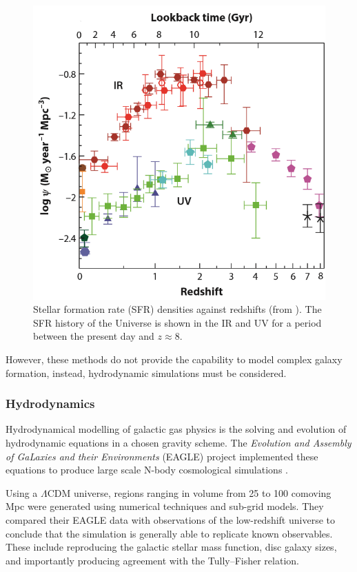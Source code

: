 \documentclass[12pt, twocolumn, nofootinbib]{revtex4-1}    %
\begin{document}
\begin{figure}
\includegraphics[width=\linewidth]{introduction/madau_2012}
\caption{Stellar formation rate (SFR) densities against redshifts (from \citealt{2014ARA&A..52..415M}). The SFR history of the Universe is shown in the IR and UV for a period between the present day and $z\approx8$.}
\label{fig:madau}
\end{figure}

However, these methods do not provide the capability to model complex galaxy formation, instead, hydrodynamic simulations must be considered. 

\vspace{2ex} %
\subsubsection{Hydrodynamics}
\noindent
Hydrodynamical modelling of galactic gas physics is the solving and evolution of hydrodynamic equations in a chosen gravity scheme. The \textit{Evolution and Assembly of GaLaxies and their Environments} (EAGLE) project implemented these equations to produce large scale N-body cosmological simulations \citep{2015MNRAS.446..521S}.

Using a $\Lambda$CDM universe, regions ranging in volume from 25 to 100 comoving Mpc were generated using numerical techniques and sub-grid models. They compared their EAGLE data with observations of the low-redshift universe to conclude that the simulation is generally able to replicate known observables. These include reproducing the galactic stellar mass function, disc galaxy sizes, and importantly producing agreement with the Tully--Fisher relation.
\end{document}
